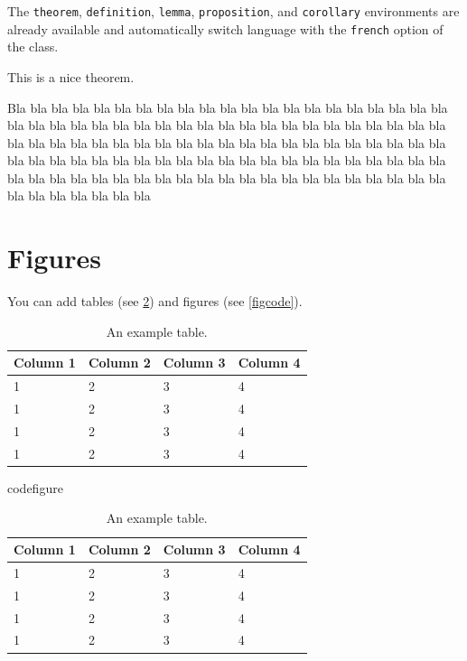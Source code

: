 \documentclass{cap2026}
\begin{document}
The \texttt{theorem}, \texttt{definition}, \texttt{lemma}, \texttt{proposition}, and \texttt{corollary} environments are already available and automatically switch language with the \texttt{french} option of the class.

\begin{theorem}[Bla]
  This is a nice theorem.
\end{theorem}

Bla bla bla bla bla bla bla bla bla bla bla bla bla bla bla bla bla
bla bla bla bla bla bla bla bla bla bla bla bla bla bla bla bla bla
bla bla bla bla bla bla bla bla bla bla bla bla bla bla bla bla bla
bla bla bla bla bla bla bla bla bla bla bla bla bla bla bla bla bla
bla bla bla bla bla bla bla bla bla bla bla bla bla bla bla bla bla
bla bla bla bla bla bla bla bla bla bla bla bla bla bla bla bla bla
bla bla bla bla bla bla bla bla bla bla


\section{Figures}
\label{secles-figures}
You can add tables (see \cref{tabtab}) and figures (see \cref{figcode}).

\begin{table}
  \centering  
  \begin{tabular}{llll}
    \toprule
    \textbf{Column 1} & \textbf{Column 2} & \textbf{Column 3} &
    \textbf{Column 4} \\ \midrule
    1 & 2 & 3 & 4 \\ 
    1 & 2 & 3 & 4 \\ 
    1 & 2 & 3 & 4 \\ 
    1 & 2 & 3 & 4 \\ \bottomrule
  \end{tabular}
  \caption{An example table.\label{tabtab}}
\end{table}

\begin{SaveVerbatim}{codefigure}
\begin{table}
  \centering  
  \begin{tabular}{llll}
    \toprule
    \textbf{Column 1} & \textbf{Column 2} & \textbf{Column 3} &
    \textbf{Column 4} \\ \midrule
    1 & 2 & 3 & 4 \\ 
    1 & 2 & 3 & 4 \\ 
    1 & 2 & 3 & 4 \\ 
    1 & 2 & 3 & 4 \\ \bottomrule
  \end{tabular}
  \caption{An example table.\label{tabtab}}
\end{table}
\end{SaveVerbatim}
\end{document}
